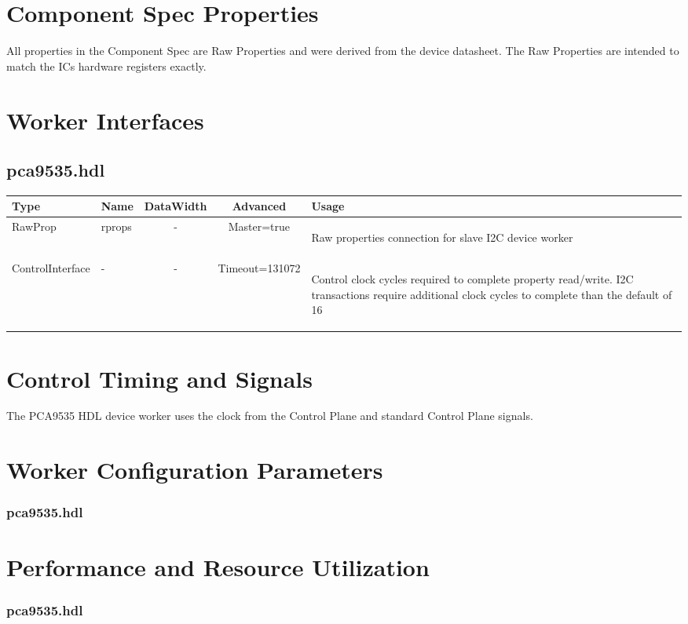 \documentclass{article}
\def\comp{pca9535}
\edef\ecomp{pca9535}
\def\Comp{PCA9535}
\begin{document}
\begin{landscape}
\section*{Component Spec Properties}
All properties in the Component Spec are Raw Properties and were derived from the device datasheet\cite{datasheet}. The Raw Properties are intended to match the ICs hardware registers exactly.
	\section*{Worker Interfaces}
	\subsection*{\comp.hdl}
	\begin{scriptsize}
		\begin{tabular}{|M{2cm}|M{1.5cm}|c|c|M{12cm}|}
			\hline
			Type & Name & DataWidth & Advanced & Usage \\
			\hline
			RawProp
			& rprops
			& -
			& Master=true
			& \begin{flushleft}Raw properties connection for slave I2C device worker\end{flushleft}\\
			\hline
			ControlInterface
			& -
			& -
			& Timeout=131072
			& \begin{flushleft}Control clock cycles required to complete property  read/write. I2C transactions require additional clock cycles to complete than the default of 16 \end{flushleft}\\
			\hline
		\end{tabular}
	\end{scriptsize}
\end{landscape}

\section*{Control Timing and Signals}
The \Comp{} HDL device worker uses the clock from the Control Plane and standard Control Plane signals.

\begin{landscape}
\section*{Worker Configuration Parameters}
\subsubsection*{\comp.hdl}

\section*{Performance and Resource Utilization}
\subsubsection*{\comp.hdl}

\end{landscape}
\end{document}
